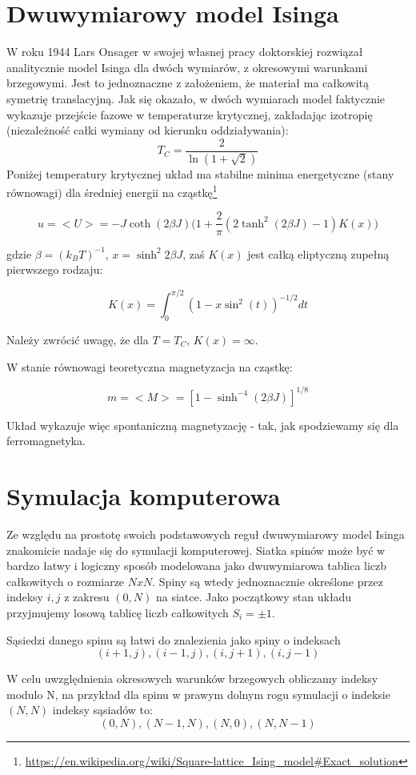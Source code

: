 \documentclass[11pt]{article}
\begin{document}
\section{Dwuwymiarowy model Isinga}
W roku 1944 Lars Onsager w swojej własnej pracy doktorskiej rozwiązał analitycznie
model Isinga dla dwóch wymiarów, z okresowymi warunkami brzegowymi. Jest to jednoznaczne z założeniem,
że materiał ma całkowitą symetrię translacyjną. Jak się okazało, w dwóch wymiarach model faktycznie
wykazuje przejście fazowe w temperaturze krytycznej, zakładając izotropię
(niezależność całki wymiany od kierunku oddziaływania):
\[ T_C = \frac{2}{\ln{(1+\sqrt{2})}} \]
Poniżej temperatury krytycznej układ ma stabilne minima energetyczne (stany równowagi) dla średniej
energii na cząstkę\footnote{\url{https://en.wikipedia.org/wiki/Square-lattice_Ising_model#Exact_solution}}

\[ u = <U> = -J \coth{(2\beta J)} \Big(1+\frac{2}{\pi}(2\tanh^2{(2\beta J)} -1) K(x) \Big) \]

gdzie $\beta=(k_B T)^{-1}$, $x=\sinh^2{2 \beta J}$, zaś $K(x)$ jest całką eliptyczną zupełną pierwszego rodzaju:

\[ K(x) = \int_0^{\pi/2} (1-x \sin^2(t))^{-1/2} dt\]

Należy zwrócić uwagę, że dla $T=T_C$, $K(x)=\infty$.

W stanie równowagi teoretyczna magnetyzacja na cząstkę:

\[m = <M> = [1-\sinh^{-4}{(2\beta J)}]^{1/8} \]

Układ wykazuje więc spontaniczną magnetyzację - tak, jak spodziewamy się dla
ferromagnetyka.

\section{Symulacja komputerowa}
Ze względu na prostotę swoich podstawowych reguł dwuwymiarowy model Isinga znakomicie
nadaje się do symulacji komputerowej. Siatka spinów może być w bardzo łatwy i logiczny sposób
modelowana jako dwuwymiarowa tablica liczb całkowitych o rozmiarze $NxN$. Spiny są wtedy jednoznacznie określone
przez indeksy $i, j$ z zakresu $(0,N)$ na siatce. Jako początkowy stan układu przyjmujemy losową tablicę
liczb całkowitych $S_i = \pm 1$.

Sąsiedzi danego spinu są łatwi do znalezienia jako spiny o indeksach
\[(i+1, j), (i-1,j), (i,j+1), (i,j-1)\]

W celu uwzględnienia okresowych warunków brzegowych obliczamy indeksy modulo N, na przykład
dla spinu w prawym dolnym rogu symulacji o indeksie $(N,N)$ indeksy sąsiadów to:
\[(0,N), (N-1,N), (N,0),(N,N-1)\]
\end{document}
